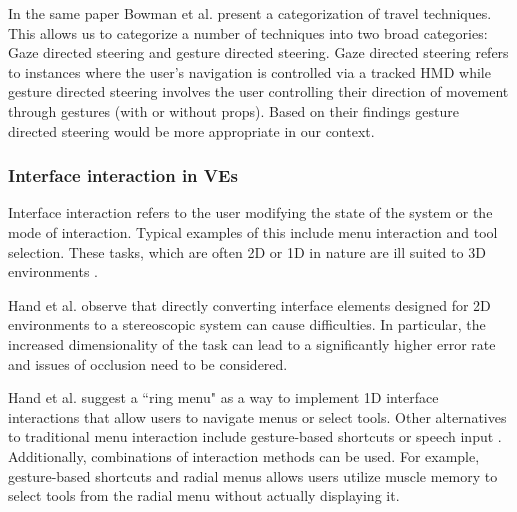 \documentclass{sig-alternate-05-2015}
\begin{document}
 In the same paper Bowman et al. present a categorization of travel techniques\cite{Bowman1997}. This allows us to categorize a number of techniques into two broad categories: Gaze directed steering and gesture directed steering. Gaze directed steering refers to instances where the user's navigation is controlled via a tracked HMD while gesture directed  steering involves the user controlling their direction of movement through gestures (with or without props). Based on their findings gesture directed steering would be more appropriate in our context.
 


\subsubsection{Interface interaction in VEs}
 Interface interaction refers to the user modifying the state of the system or the mode of interaction\cite{Bowman2001}. Typical examples of this include menu interaction and tool selection. These tasks, which are often 2D or 1D in nature are ill suited to 3D environments \cite{Bowman2001, Hand1997}.
 
 Hand et al. observe that directly converting interface elements designed for 2D environments to a stereoscopic system can cause difficulties.\cite{Hand1997} In particular, the increased dimensionality of the task can lead to a significantly higher error rate and issues of occlusion need to be considered.
 
 Hand et al. suggest a ``ring menu" as a way to implement 1D interface interactions that allow users to navigate menus or select tools\cite{Hand1997}. Other alternatives to traditional menu interaction include gesture-based shortcuts\cite{Zeleznik2007} or speech input \cite{VanDam1997,Bowman2001,Hand1997}. Additionally, combinations of interaction methods can be used. For example, gesture-based shortcuts and radial menus allows users utilize muscle memory to select tools from the radial menu without actually displaying it.\cite{Kurtenbach1993}
 
\end{document}
